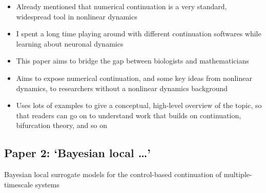 \documentclass[11pt]{article}
\begin{document}
\begin{itemize}
\item Already mentioned that numerical continuation is a very standard, widespread tool in nonlinear dynamics
\item I spent a long time playing around with different continuation softwares while learning about neuronal dynamics
\item This paper aims to bridge the gap between biologists and mathematicians
\item Aims to expose numerical continuation, and some key ideas from nonlinear dynamics, to researchers without a nonlinear dynamics background
\item Uses lots of examples to give a conceptual, high-level overview of the topic, so that readers can go on to understand work that builds on continuation, bifurcation theory, and so on
\end{itemize}

\subsection{Paper 2: `Bayesian local \dots{}'}
\label{sec:org29e5bc9}

\begin{center}
Bayesian local surrogate models for the control-based continuation of multiple-timescale systems
\end{center}
\end{document}
